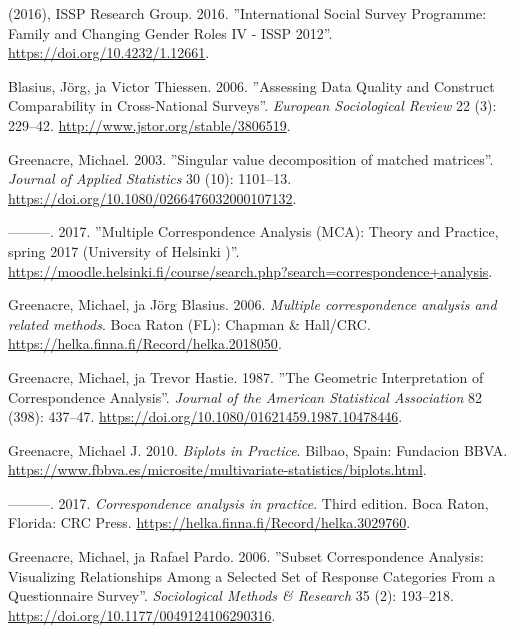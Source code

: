 \documentclass[
  finnish,
]{book}
\begin{document}
\hypertarget{refs}{}
\leavevmode\hypertarget{ref-RefWorks:doc:5b6c7b0de4b0fd36f5bb4c2a}{}%
(2016), ISSP Research Group. 2016. ''International Social Survey
Programme: Family and Changing Gender Roles IV - ISSP 2012''.
\url{https://doi.org/10.4232/1.12661}.

\leavevmode\hypertarget{ref-RefWorks:doc:5b15542ee4b0e2616bc42dca}{}%
Blasius, Jörg, ja Victor Thiessen. 2006. ''Assessing Data Quality and
Construct Comparability in Cross-National Surveys''. \emph{European
Sociological Review} 22 (3): 229--42.
\url{http://www.jstor.org/stable/3806519}.

\leavevmode\hypertarget{ref-RefWorks:doc:5b6f159ce4b0bc0f31734b76}{}%
Greenacre, Michael. 2003. ''Singular value decomposition of matched
matrices''. \emph{Journal of Applied Statistics} 30 (10): 1101--13.
\url{https://doi.org/10.1080/0266476032000107132}.

\leavevmode\hypertarget{ref-RefWorks:doc:5b6ef091e4b0984fd9b8c0ca}{}%
---------. 2017. ''Multiple Correspondence Analysis (MCA): Theory and
Practice, spring 2017 (University of Helsinki )''.
\url{https://moodle.helsinki.fi/course/search.php?search=correspondence+analysis}.

\leavevmode\hypertarget{ref-RefWorks:doc:5ab76b43e4b003f4468d1f07}{}%
Greenacre, Michael, ja Jörg Blasius. 2006. \emph{Multiple correspondence
analysis and related methods}. Boca Raton (FL): Chapman \& Hall/CRC.
\url{https://helka.finna.fi/Record/helka.2018050}.

\leavevmode\hypertarget{ref-RefWorks:doc:5a857a44e4b0ed2d44664d84}{}%
Greenacre, Michael, ja Trevor Hastie. 1987. ''The Geometric
Interpretation of Correspondence Analysis''. \emph{Journal of the
American Statistical Association} 82 (398): 437--47.
\url{https://doi.org/10.1080/01621459.1987.10478446}.

\leavevmode\hypertarget{ref-RefWorks:doc:5a857a43e4b0ed2d44664d7c}{}%
Greenacre, Michael J. 2010. \emph{Biplots in Practice}. Bilbao, Spain:
Fundacion BBVA.
\url{https://www.fbbva.es/microsite/multivariate-statistics/biplots.html}.

\leavevmode\hypertarget{ref-RefWorks:doc:5a857a43e4b0ed2d44664d78}{}%
---------. 2017. \emph{Correspondence analysis in practice}. Third
edition. Boca Raton, Florida: CRC Press.
\url{https://helka.finna.fi/Record/helka.3029760}.

\leavevmode\hypertarget{ref-RefWorks:doc:5a857a44e4b0ed2d44664d87}{}%
Greenacre, Michael, ja Rafael Pardo. 2006. ''Subset Correspondence
Analysis: Visualizing Relationships Among a Selected Set of Response
Categories From a Questionnaire Survey''. \emph{Sociological Methods \&
Research} 35 (2): 193--218.
\url{https://doi.org/10.1177/0049124106290316}.
\end{document}
